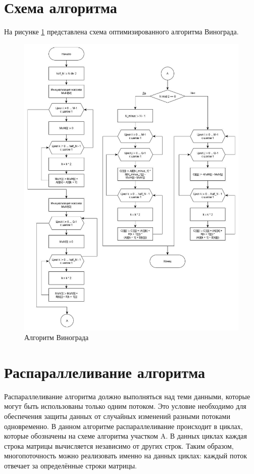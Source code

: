 \documentclass[12pt, a4paper]{report}
\begin{document}
	\section{Схема алгоритма}
	На рисунке \ref{pic:vin} представлена схема оптимизированного алгоритма Винограда.
	\newpage
	\begin{figure}[ht!]
		\centering
		\includegraphics[scale=0.45]{vin.jpg}
		\caption{Алгоритм Винограда}
		\label{pic:vin}
	\end{figure}

	\newpage
	
	\section{Распараллеливание алгоритма}
	Распараллеливание алгоритма должно выполняться над теми данными, которые могут быть использованы только одним потоком. Это условие необходимо для обеспечения защиты данных от случайных изменений разными потоками одновременно. В данном алгоритме распараллеливание происходит в циклах, которые обозначены на схеме алгоритма участком A. В данных циклах каждая строка матрицы вычисляется независимо от других строк. Таким образом, многопоточность можно реализовать именно на данных циклах: каждый поток отвечает за определённые строки матрицы.
	
\end{document}
